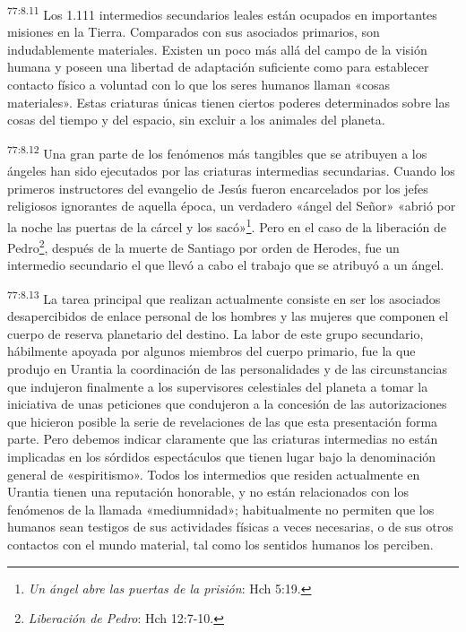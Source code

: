 \par
\textsuperscript{77:8.11} Los 1.111 intermedios secundarios leales están ocupados en importantes misiones en la Tierra. Comparados con sus asociados primarios, son indudablemente materiales. Existen un poco más allá del campo de la visión humana y poseen una libertad de adaptación suficiente como para establecer contacto físico a voluntad con lo que los seres humanos llaman «cosas materiales». Estas criaturas únicas tienen ciertos poderes determinados sobre las cosas del tiempo y del espacio, sin excluir a los animales del planeta.

\par
\textsuperscript{77:8.12} Una gran parte de los fenómenos más tangibles que se atribuyen a los ángeles han sido ejecutados por las criaturas intermedias secundarias. Cuando los primeros instructores del evangelio de Jesús fueron encarcelados por los jefes religiosos ignorantes de aquella época, un verdadero «ángel del Señor» «abrió por la noche las puertas de la cárcel y los sacó»\footnote{\textit{Un ángel abre las puertas de la prisión}: Hch 5:19.}. Pero en el caso de la liberación de Pedro\footnote{\textit{Liberación de Pedro}: Hch 12:7-10.}, después de la muerte de Santiago por orden de Herodes, fue un intermedio secundario el que llevó a cabo el trabajo que se atribuyó a un ángel.

\par
\textsuperscript{77:8.13} La tarea principal que realizan actualmente consiste en ser los asociados desapercibidos de enlace personal de los hombres y las mujeres que componen el cuerpo de reserva planetario del destino. La labor de este grupo secundario, hábilmente apoyada por algunos miembros del cuerpo primario, fue la que produjo en Urantia la coordinación de las personalidades y de las circunstancias que indujeron finalmente a los supervisores celestiales del planeta a tomar la iniciativa de unas peticiones que condujeron a la concesión de las autorizaciones que hicieron posible la serie de revelaciones de las que esta presentación forma parte. Pero debemos indicar claramente que las criaturas intermedias no están implicadas en los sórdidos espectáculos que tienen lugar bajo la denominación general de «espiritismo». Todos los intermedios que residen actualmente en Urantia tienen una reputación honorable, y no están relacionados con los fenómenos de la llamada «mediumnidad»; habitualmente no permiten que los humanos sean testigos de sus actividades físicas a veces necesarias, o de sus otros contactos con el mundo material, tal como los sentidos humanos los perciben.

